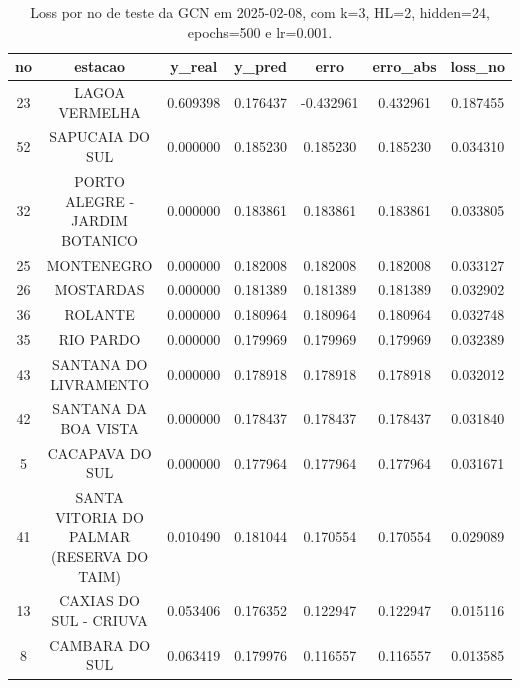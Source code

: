 \begin{table}[h]
\centering
\caption{Loss por no de teste da GCN em 2025-02-08, com k=3, HL=2, hidden=24, epochs=500 e lr=0.001.}
\label{tab:gcn_loss_k3_hl2_h24_e500_d20250208}
\begin{tabular}{ccccccc}
\toprule
no & estacao & y\_real & y\_pred & erro & erro\_abs & loss\_no \\
\midrule
23 & LAGOA VERMELHA & 0.609398 & 0.176437 & -0.432961 & 0.432961 & 0.187455 \\
52 & SAPUCAIA DO SUL & 0.000000 & 0.185230 & 0.185230 & 0.185230 & 0.034310 \\
32 & PORTO ALEGRE - JARDIM BOTANICO & 0.000000 & 0.183861 & 0.183861 & 0.183861 & 0.033805 \\
25 & MONTENEGRO & 0.000000 & 0.182008 & 0.182008 & 0.182008 & 0.033127 \\
26 & MOSTARDAS & 0.000000 & 0.181389 & 0.181389 & 0.181389 & 0.032902 \\
36 & ROLANTE & 0.000000 & 0.180964 & 0.180964 & 0.180964 & 0.032748 \\
35 & RIO PARDO & 0.000000 & 0.179969 & 0.179969 & 0.179969 & 0.032389 \\
43 & SANTANA DO LIVRAMENTO & 0.000000 & 0.178918 & 0.178918 & 0.178918 & 0.032012 \\
42 & SANTANA DA BOA VISTA & 0.000000 & 0.178437 & 0.178437 & 0.178437 & 0.031840 \\
5 & CACAPAVA DO SUL & 0.000000 & 0.177964 & 0.177964 & 0.177964 & 0.031671 \\
41 & SANTA VITORIA DO PALMAR (RESERVA DO TAIM) & 0.010490 & 0.181044 & 0.170554 & 0.170554 & 0.029089 \\
13 & CAXIAS DO SUL - CRIUVA & 0.053406 & 0.176352 & 0.122947 & 0.122947 & 0.015116 \\
8 & CAMBARA DO SUL & 0.063419 & 0.179976 & 0.116557 & 0.116557 & 0.013585 \\
\bottomrule
\end{tabular}
\end{table}
